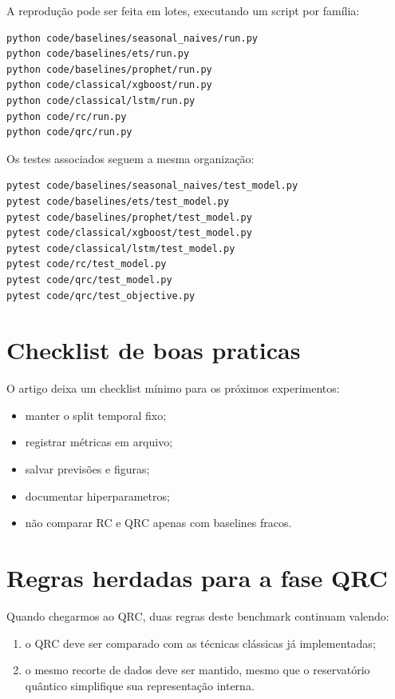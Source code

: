 \documentclass[12pt]{article}
\providecommand{\tightlist}{%
          \setlength{\itemsep}{0pt}\setlength{\parskip}{0pt}}
\begin{document}
A reprodução pode ser feita em lotes, executando um script por família:

\begin{verbatim}
python code/baselines/seasonal_naives/run.py
python code/baselines/ets/run.py
python code/baselines/prophet/run.py
python code/classical/xgboost/run.py
python code/classical/lstm/run.py
python code/rc/run.py
python code/qrc/run.py
\end{verbatim}

Os testes associados seguem a mesma organização:

\begin{verbatim}
pytest code/baselines/seasonal_naives/test_model.py
pytest code/baselines/ets/test_model.py
pytest code/baselines/prophet/test_model.py
pytest code/classical/xgboost/test_model.py
pytest code/classical/lstm/test_model.py
pytest code/rc/test_model.py
pytest code/qrc/test_model.py
pytest code/qrc/test_objective.py
\end{verbatim}

\section{Checklist de boas praticas}\label{9-checklist-de-boas-praticas}

O artigo deixa um checklist mínimo para os próximos experimentos:

\begin{itemize}
\tightlist
\item
  manter o split temporal fixo;
\item
  registrar métricas em arquivo;
\item
  salvar previsões e figuras;
\item
  documentar hiperparametros;
\item
  não comparar RC e QRC apenas com baselines fracos.
\end{itemize}

\section{Regras herdadas para a fase QRC}\label{10-regras-herdadas-para-a-fase-qrc}

Quando chegarmos ao QRC, duas regras deste benchmark continuam valendo:

\begin{enumerate}
\def\labelenumi{\arabic{enumi}.}
\tightlist
\item
  o QRC deve ser comparado com as técnicas clássicas já implementadas;
\item
  o mesmo recorte de dados deve ser mantido, mesmo que o reservatório quântico simplifique sua representação interna.
\end{enumerate}
\end{document}
